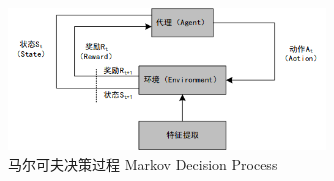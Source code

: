 
\begin{figure}[hbt]
	\centering
	\includegraphics[width=0.75\textwidth]{figures/2.3}
	\caption{马尔可夫决策过程 Markov Decision Process}\label{fig:2.3}
\end{figure}


	
